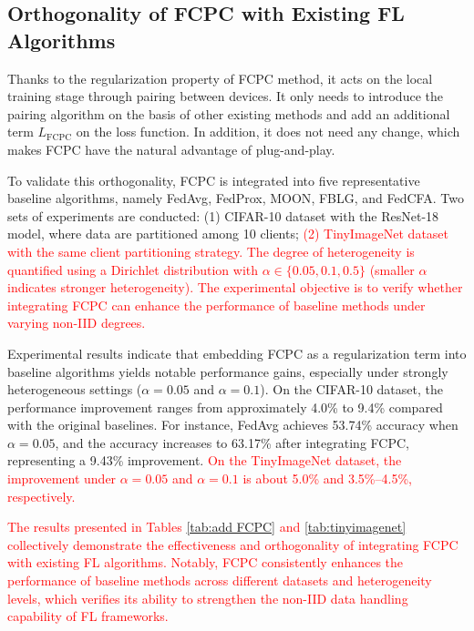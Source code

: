 \documentclass[journal,twoside,web]{ieeecolor}
\newcommand{\rev}[1]{\textcolor{red}{#1}}
\begin{document}
\subsection{ Orthogonality of FCPC with Existing FL Algorithms}

Thanks to the regularization property of FCPC method, it acts on the local training stage through pairing between devices. It only needs to introduce the pairing algorithm on the basis of other existing methods and add an additional term $L_{\text{FCPC}}$ on the loss function. In addition, it does not need any change, which makes FCPC have the natural advantage of plug-and-play.

To validate this orthogonality, FCPC is integrated into five representative baseline algorithms, namely FedAvg\cite{fedavg}, FedProx\cite{fedprox}, MOON\cite{moon}, FBLG\cite{fblg}, and FedCFA\cite{fedcfa}. Two sets of experiments are conducted: (1) CIFAR-10 dataset with the ResNet-18 model, where data are partitioned among 10 clients; \rev{ (2) TinyImageNet dataset with the same client partitioning strategy. The degree of heterogeneity is quantified using a Dirichlet distribution with \( \alpha \in \{0.05, 0.1, 0.5\} \) (smaller \( \alpha \) indicates stronger heterogeneity). The experimental objective is to verify whether integrating FCPC can enhance the performance of baseline methods under varying non-IID degrees.}



Experimental results indicate that embedding FCPC as a regularization term into baseline algorithms yields notable performance gains, especially under strongly heterogeneous settings (\( \alpha = 0.05 \) and \( \alpha = 0.1 \)). On the CIFAR-10 dataset, the performance improvement ranges from approximately 4.0\% to 9.4\% compared with the original baselines. For instance, FedAvg achieves 53.74\% accuracy when \( \alpha = 0.05 \), and the accuracy increases to 63.17\% after integrating FCPC, representing a 9.43\% improvement. \rev{On the TinyImageNet dataset, the improvement under \( \alpha = 0.05 \) and \( \alpha = 0.1 \) is about 5.0\% and 3.5\%–4.5\%, respectively.  }


\rev{The results presented in Tables \ref{tab:add FCPC} and \ref{tab:tinyimagenet} collectively demonstrate the effectiveness and orthogonality of integrating FCPC with existing FL algorithms. Notably, FCPC consistently enhances the performance of baseline methods across different datasets and heterogeneity levels, which verifies its ability to strengthen the non-IID data handling capability of FL frameworks.}
\end{document}
